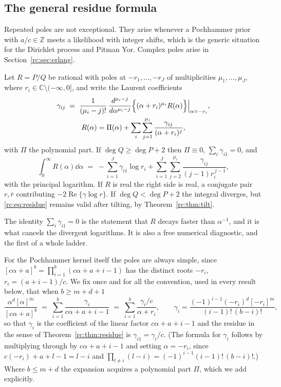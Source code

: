 \subsection{The general residue formula}

Repeated poles are not exceptional. They arise whenever a Pochhammer prior with $a/c\in\mathbb{Z}$ meets a likelihood with integer shifts, which is the generic situation for the Dirichlet process and Pitman Yor. Complex poles arise in Section~\ref{rc:sec:erlang}.

\begin{theorem}\label{rc:thm:residue}
Let $R=P/Q$ be rational with poles at $-r_1,\dots,-r_J$ of multiplicities $\mu_1,\dots,\mu_J$, where $r_i\in\mathbb{C}\setminus(-\infty,0]$, and write the Laurent coefficients
\begin{gather*}
\gamma_{ij}\;=\;\frac{1}{(\mu_i-j)!}\,\frac{d^{\mu_i-j}}{d\alpha^{\mu_i-j}}\Bigl\{(\alpha+r_i)^{\mu_i}R(\alpha)\Bigr\}\Big|_{\alpha=-r_i},\\
R(\alpha)=\Pi(\alpha)+\sum_i\sum_{j=1}^{\mu_i}\frac{\gamma_{ij}}{(\alpha+r_i)^j},
\end{gather*}
with $\Pi$ the polynomial part. If $\deg Q\ge\deg P+2$ then $\Pi\equiv0$, $\sum_i\gamma_{i1}=0$, and
\begin{equation}\label{rc:eq:residue}
\int_0^\infty R(\alpha)\dd\alpha\;=\;-\sum_{i=1}^J\gamma_{i1}\log r_i+\sum_{i=1}^J\sum_{j=2}^{\mu_i}\frac{\gamma_{ij}}{(j-1)r_i^{\,j-1}},
\end{equation}
with the principal logarithm. If $R$ is real the right side is real, a conjugate pair $r,\bar r$ contributing $-2\operatorname{Re}\{\gamma\log r\}$. If $\deg Q<\deg P+2$ the integral diverges, but \eqref{rc:eq:residue} remains valid after tilting, by Theorem~\ref{rc:thm:tilt}.
\end{theorem}

The identity $\sum_i\gamma_{i1}=0$ is the statement that $R$ decays faster than $\alpha^{-1}$, and it is what cancels the divergent logarithms. It is also a free numerical diagnostic, and the first of a whole ladder.

For the Pochhammer kernel itself the poles are always simple, since $[c\alpha+a]^b=\prod_{i=1}^b(c\alpha+a+i-1)$ has the distinct roots $-r_i$, $r_i=(a+i-1)/c$. We fix once and for all the convention, used in every result below, that when $b\ge m+d+1$
\begin{equation}\label{rc:eq:pfconv}
\frac{\alpha^d[\alpha]^m}{[c\alpha+a]^b}\;=\;\sum_{i=1}^b\frac{\gamma_i}{c\alpha+a+i-1}\;=\;\sum_{i=1}^b\frac{\gamma_i/c}{\alpha+r_i},\qquad \gamma_i=\frac{(-1)^{i-1}(-r_i)^d[-r_i]^m}{(i-1)!\,(b-i)!},
\end{equation}
so that $\gamma_i$ is the coefficient of the linear factor $c\alpha+a+i-1$ and the residue in the sense of Theorem~\ref{rc:thm:residue} is $\gamma_{i1}=\gamma_i/c$. (The formula for $\gamma_i$ follows by multiplying through by $c\alpha+a+i-1$ and setting $\alpha=-r_i$, since $c(-r_i)+a+l-1=l-i$ and $\prod_{l\ne i}(l-i)=(-1)^{i-1}(i-1)!\,(b-i)!$.) Where $b\le m+d$ the expansion acquires a polynomial part $\Pi$, which we add explicitly.

